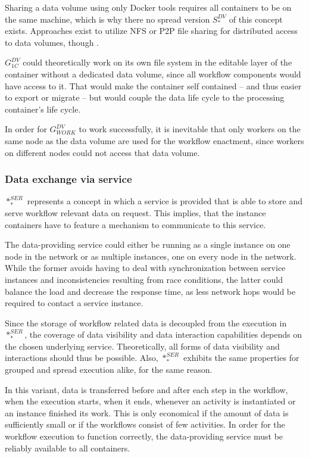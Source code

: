     Sharing a data volume using only Docker tools requires all containers to be on the same machine, which is why there no spread version $S_{*}^{DV}$ of this concept exists. Approaches exist to utilize \ac{NFS} or \ac{P2P} file sharing for distributed access to data volumes, though \cite{Miell2015How}.

    $G_{1C}^{DV}$ could theoretically work on its own file system in the editable layer of the container without a dedicated data volume, since all workflow components would have access to it. That would make the container self contained -- and thus easier to export or migrate -- but would couple the data life cycle to the processing container's life cycle.

    In order for $G_{WORK}^{DV}$ to work successfully, it is inevitable that only workers on the same node as the data volume are used for the workflow enactment, since workers on different nodes could not access that data volume.

  \subsubsection{Data exchange via service} %
  \label{ssub:data_exchange_via_service}
    $*_{*}^{SER}$ represents a concept in which a service is provided that is able to store and serve workflow relevant data on request. This implies, that the instance containers have to feature a mechanism to communicate to this service.

    The data-providing service could either be running as a single instance on one node in the network or as multiple instances, one on every node in the network. While the former avoids having to deal with synchronization between service instances and inconsistencies resulting from race conditions, the latter could balance the load and decrease the response time, as less network hops would be required to contact a service instance.

    Since the storage of workflow related data is decoupled from the execution in $*_{*}^{SER}$, the coverage of data visibility and data interaction capabilities depends on the chosen underlying service. Theoretically, all forms of data visibility and interactions should thus be possible. Also, $*_{*}^{SER}$ exhibits the same properties for grouped and spread execution alike, for the same reason.

    In this variant, data is transferred before and after each step in the workflow, \ie when the execution starts, when it ends, whenever an activity is instantiated or an instance finished its work. This is only economical if the amount of data is sufficiently small or if the workflows consist of few activities. In order for the workflow execution to function correctly, the data-providing service must be reliably available to all containers.


